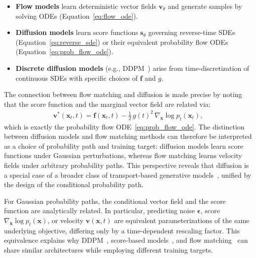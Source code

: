 \begin{itemize}
    \item \textbf{Flow models} learn deterministic vector fields $\mathbf{v}_\theta$ and generate samples by solving ODEs (Equation~\ref{eq:flow_ode}).
    \item \textbf{Diffusion models} learn score functions $\mathbf{s}_\theta$ governing reverse-time SDEs (Equation~\ref{eq:reverse_sde}) or their equivalent probability flow ODEs (Equation~\ref{eq:prob_flow_ode}).
    \item \textbf{Discrete diffusion models} (e.g., DDPM~\cite{ho2020denoising}) arise from time-discretization of continuous SDEs with specific choices of $\mathbf{f}$ and $g$.
\end{itemize}

The connection between flow matching and diffusion is made precise by noting that the score function and the marginal vector field are related via:
\begin{align}
    \mathbf{v}^*(\mathbf{x}_t, t) = \mathbf{f}(\mathbf{x}_t, t) - \frac{1}{2}\,g(t)^2\,\nabla_{\mathbf{x}} \log p_t(\mathbf{x}_t),
    \label{eq:flow_score_relation}
\end{align}
which is exactly the probability flow ODE~\eqref{eq:prob_flow_ode}. The distinction between diffusion models and flow matching methods can therefore be interpreted as a choice of probability path and training target: diffusion models learn score functions under Gaussian perturbations, whereas flow matching learns velocity fields under arbitrary probability paths. This perspective reveals that diffusion is a special case of a broader class of transport-based generative models~\cite{albergo2023stochastic}, unified by the design of the conditional probability path.

For Gaussian probability paths, the conditional vector field and the score function are analytically related. In particular, predicting noise $\boldsymbol{\epsilon}$, score $\nabla_{\mathbf{x}} \log p_t(\mathbf{x})$, or velocity $\mathbf{v}(\mathbf{x}, t)$ are equivalent parameterizations of the same underlying objective, differing only by a time-dependent rescaling factor. This equivalence explains why DDPM~\cite{ho2020denoising}, score-based models~\cite{song2021scorebased}, and flow matching~\cite{lipman2023flow} can share similar architectures while employing different training targets.

